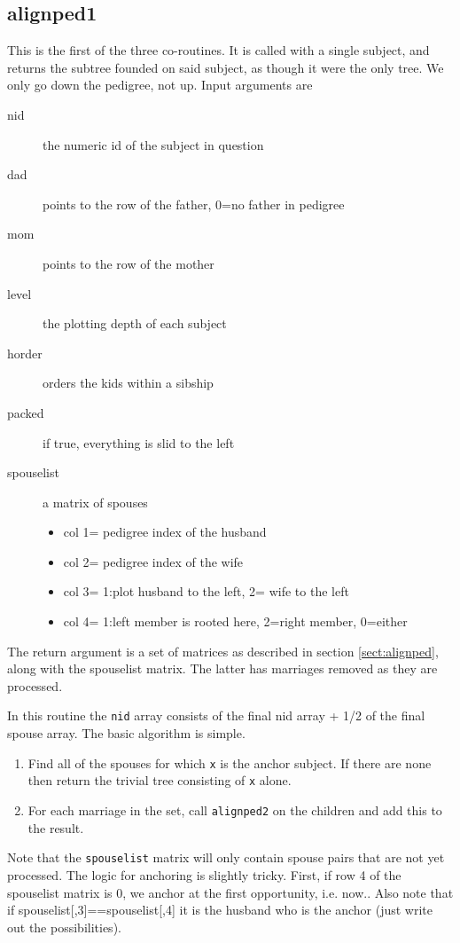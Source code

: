 \documentclass{article}
\begin{document}
\subsection{alignped1}
This is the first of the three co-routines.
It is called with a single subject, and returns the subtree founded
on said subject, as though it were the only tree.  
We only go down the pedigree, not up.
Input arguments are
\begin{description}
  \item[nid] the numeric id of the subject in question
  \item[dad] points to the row of the father, 0=no father in pedigree
  \item[mom] points to the row of the mother
  \item[level] the plotting depth of each subject
  \item[horder] orders the kids within a sibship
  \item[packed] if true, everything is slid to the left
  \item[spouselist] a matrix of spouses
    \begin{itemize}
      \item col 1= pedigree index of the husband
      \item col 2= pedigree index of the wife
      \item col 3= 1:plot husband to the left, 2= wife to the left
      \item col 4= 1:left member is rooted here, 2=right member, 0=either
    \end{itemize}
\end{description}

The return argument is a set of matrices as described in 
section \ref{sect:alignped}, along with the spouselist matrix.
The latter has marriages removed as they are processed.

In this routine the \Verb!nid! array consists of the final nid array + 1/2 of the
final spouse array.
The basic algorithm is simple.  
\begin{enumerate}
  \item Find all of the spouses for which \Verb!x! is the anchor subject.  If
    there are none then return the trivial tree consisting of \Verb!x! alone.
  \item For each marriage in the set, call \Verb!alignped2! on the children
    and add this to the result.
\end{enumerate}
Note that the \Verb!spouselist! matrix will only contain spouse pairs that
are not yet processed.
The logic for anchoring is slightly tricky.  First, if row 4 of
the spouselist matrix is 0, we anchor at the first opportunity, i.e. now..
Also note that if spouselist[,3]==spouselist[,4] it is
the husband who is the anchor (just write out the possibilities).
\end{document}
